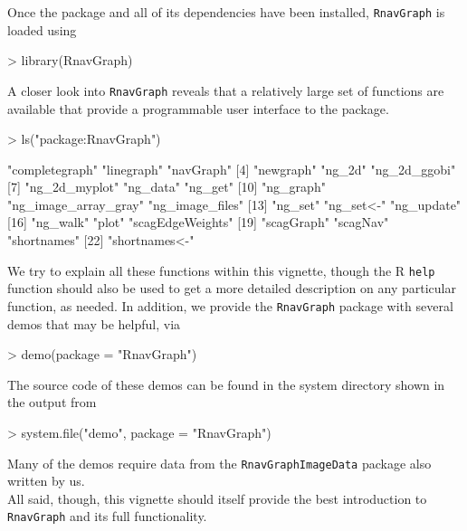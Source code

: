 \documentclass[12pt,oneside,titlepage,letter]{article}
\begin{document}
Once the package and all of its dependencies have been installed,  \texttt{RnavGraph} is loaded using
\begin{Schunk}
\begin{Sinput}
> library(RnavGraph)
\end{Sinput}
\end{Schunk}
A closer look into \texttt{RnavGraph} reveals that a relatively large set of functions are available that provide a programmable user interface to the package.
\begin{Schunk}
\begin{Sinput}
> ls("package:RnavGraph")
\end{Sinput}
\begin{Soutput}
 [1] "completegraph"       "linegraph"           "navGraph"           
 [4] "newgraph"            "ng_2d"               "ng_2d_ggobi"        
 [7] "ng_2d_myplot"        "ng_data"             "ng_get"             
[10] "ng_graph"            "ng_image_array_gray" "ng_image_files"     
[13] "ng_set"              "ng_set<-"            "ng_update"          
[16] "ng_walk"             "plot"                "scagEdgeWeights"    
[19] "scagGraph"           "scagNav"             "shortnames"         
[22] "shortnames<-"       
\end{Soutput}
\end{Schunk}

We try to explain all these functions within this vignette, though the R \texttt{help} function should also be used to get a more detailed description on any particular function, as needed. 
In addition, we provide the \texttt{RnavGraph} package with several demos that may be helpful, via
\begin{Schunk}
\begin{Sinput}
> demo(package = "RnavGraph")
\end{Sinput}
\end{Schunk}
The source code of these demos can be found in the system directory shown in the output from
\begin{Schunk}
\begin{Sinput}
> system.file("demo", package = "RnavGraph")
\end{Sinput}
\end{Schunk}
Many of the demos require data from the \texttt{RnavGraphImageData} package also written by us.\\

All said, though, this vignette should itself provide the best introduction to \texttt{RnavGraph} and its full functionality.
\end{document}
